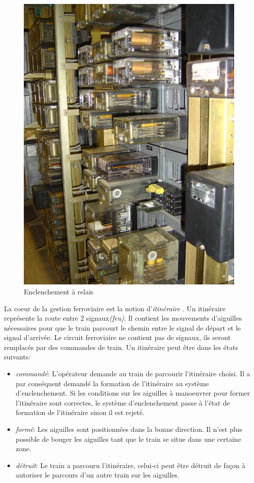 \begin{figure}[ht]
\begin{minipage}[c]{.46\linewidth}
        \includegraphics[scale=0.075]{enclenchement_relais.jpg}
        \caption{Enclenchement à relais}
        \label{relais}
    \end{minipage}
\end{figure}


La coeur de la gestion
  ferroviaire est la notion d'\emph{itinéraire} \cite{siteferro}. Un itinéraire
  représente la route entre 2 signaux\emph{(feu)}. Il contient les mouvements
  d'aiguilles nécessaires pour que le train parcourt le chemin entre le
  signal de départ et le signal d'arrivée. Le circuit ferroviaire ne
  contient pas de signaux, ils seront remplacés par des commandes de
  train. Un itinéraire peut être dans les états suivants:
  \begin{itemize}
\item \emph{commandé}: L'opérateur demande au train de parcourir
      l'itinéraire choisi. Il a par conséquent demandé la formation de
      l'itinéraire au système d'enclenchement. Si les conditions sur
      les aiguilles à manoeuvrer pour former l'itinéraire sont
      correctes, le système d'enclenchement passe à l'état de formation de
      l'itinéraire sinon il est rejeté.
\item \emph{formé}: Les aiguilles sont positionnées dans la bonne
      direction. Il n'est plus possible de bouger les aiguilles tant
      que le train se situe dans une certaine zone.
\item \emph{détruit}: Le train a parcouru l'itinéraire, celui-ci peut
      être détruit de façon à autoriser le parcours d'un autre train sur les
      aiguilles.  
  \end{itemize}


